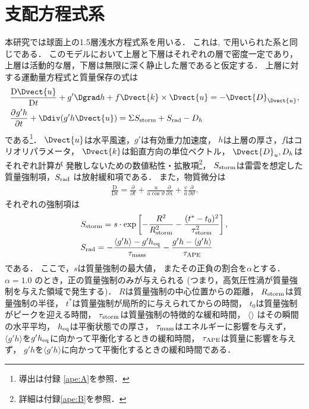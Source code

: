 \documentclass[a4j,12pt,openbib,oneside]{jreport}
\def\DD#1#2{\frac{\mathrm D #1}{\mathrm D #2}}
\renewcommand{\DP}[3][]{\frac{\partial^{#1} #2}{\partial #3^{#1}}}
\begin{document}
\section{支配方程式系}
\label{sec:model1}
本研究では球面上の1.5層浅水方程式系を用いる．
これは\cite{Showman2007}, \cite{Brueshaber2019}で用いられた系と同じである．
このモデルにおいて上層と下層はそれぞれの層で密度一定であり，
上層は活動的な層，下層は無限に深く静止した層であると仮定する．
上層に対する運動量方程式と質量保存の式は
%
\begin{align}
& \DD{\Dvect{u}}{t}+ g' \Dgrad h + f \Dvect{k} \times \Dvect{u} = -\Dvect{D}_{\Dvect{u}},  \label{eq:eq1} \\
& \DP{g'h}{t} + \Ddiv (g'h\Dvect{u}) = \Sigma S_{{\rm{storm}}} + S_{{\rm{rad}}} - D_h \label{eq:eq2} 
\end{align}
%
である\footnote{導出は付録 \ref{ape:A}を参照．}．
$\Dvect{u}$は水平風速，$g'$は有効重力加速度，
$h$は上層の厚さ，$f$はコリオリパラメータ，
$\Dvect{k}$は鉛直方向の単位ベクトル，
$\Dvect{D}_u, D_h$はそれぞれ計算が
発散しないための数値粘性・拡散項\footnote{詳細は付録\ref{ape:B}を参照．}，
$S_{{\rm{storm}}}$は雷雲を想定した質量強制項，$S_{{\rm{rad}}}$ は放射緩和項である．
また，物質微分は
\begin{align}
\DD{}{t} = \DP{}{t} + \frac{u}{a\cos{\vartheta}} \DP{}{\lambda}
+\frac{v}{a} \DP{}{\vartheta}.
\end{align}
それぞれの強制項は
\begin{align}
&S_{{\rm{storm}}} = s \cdot \exp \left [- \frac{R^2}{R_{{\rm{storm}}}^2} - \frac{(t^*-t_0)^2}{\tau_{{\rm{storm}}}^2} \right ], \label{eq:eq3}\\
&S_{{\rm{rad}}}  = - \frac{\langle g'h \rangle - g'h_{{\rm{eq}}}}{\tau_{{\rm{mass}}}} - \frac{g'h - \langle g'h \rangle}{\tau_{{\rm{APE}}}} \label{eq:eq4}
\end{align}
である．
%
ここで，$s$は質量強制の最大値，
またその正負の割合を$\alpha$とする．
$\alpha=1.0$ のとき，正の質量強制のみが与えられる
(つまり，高気圧性渦が質量強制を与えた領域で発生する)．
$R$は質量強制の中心位置からの距離，
$R_{{\rm{storm}}}$は質量強制の半径，
$t^*$は質量強制が局所的に与えられてからの時間，
$t_0$は質量強制がピークを迎える時間，
$\tau_{{\rm{storm}}}$は質量強制の特徴的な緩和時間，
$\langle \rangle$ はその瞬間の水平平均，
$h_{{\rm{eq}}}$は平衡状態での厚さ，
$\tau_{{\rm{mass}}}$はエネルギーに影響を与えず，
$\langle g'h \rangle $を$g'h_{{\rm{eq}}}$に向かって平衡化するときの緩和時間，
$\tau_{{\rm{APE}}}$は質量に影響を与えず，
$g'h$を$\langle g'h \rangle$に向かって平衡化するときの緩和時間である．
\end{document}

